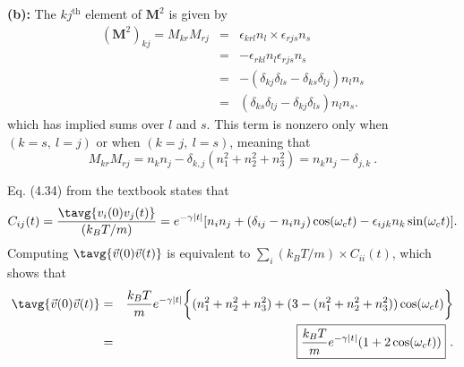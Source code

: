 \textbf{(b):} The $kj^{\text{th}}$ element of $\textbf{M}^2$ is given by
\begin{eqnarray}
(\textbf{M}^2)_{kj} = M_{kr} M_{rj} &=& \epsilon_{krl} n_l \times \epsilon_{rjs} n_s \nonumber \\
&=& -\epsilon_{rkl} n_l \epsilon_{rjs}  n_s \nonumber \\
&=& -(\delta_{kj} \delta_{ls} - \delta_{ks} \delta_{lj}) n_l n_s \nonumber \\
&=& (\delta_{ks} \delta_{lj}-\delta_{kj} \delta_{ls}) n_l n_s.
\end{eqnarray}
which has implied sums over $l$ and $s$. This term is nonzero only when $(k=s,~l=j)$ or when $(k=j,~l=s)$, meaning that 
\begin{equation}
\boxed{M_{kr} M_{rj} = n_k n_j - \delta_{k,j} (n_1^2 + n_2^2 + n_3^2) = n_k n_j - \delta_{j, k}}~.
\end{equation}


Eq. (4.34) from the textbook states that
\begin{equation}
C_{ij}(t)= \frac{\tavg{v_i(0) v_j(t)}}{(k_B T/m)} = e^{-\gamma |t|} [ n_i n_j + (\delta_{ij} - n_i n_j) \cos(\omega_c t) - \epsilon_{ijk} n_k \sin(\omega_c t)].
\end{equation}
Computing $\tavg{\vec{v}(0) \vec{v}(t)}$ is equivalent to $\sum_{i}(k_B T/m) \times C_{ii}(t)$, which shows that
\begin{eqnarray}
\tavg{\vec{v}(0) \vec{v}(t)} &=& \frac{k_B T}{m} e^{-\gamma |t|} \bigg\{ (n_1^2 + n_2^2 + n_3^2) + (3 -(n_1^2 + n_2^2 + n_3^2)) \cos(\omega_c t) \bigg\} \\
&=& \boxed{\frac{k_B T}{m} e^{-\gamma |t|} ( 1 + 2 \cos(\omega_c t))}~.
\end{eqnarray}

